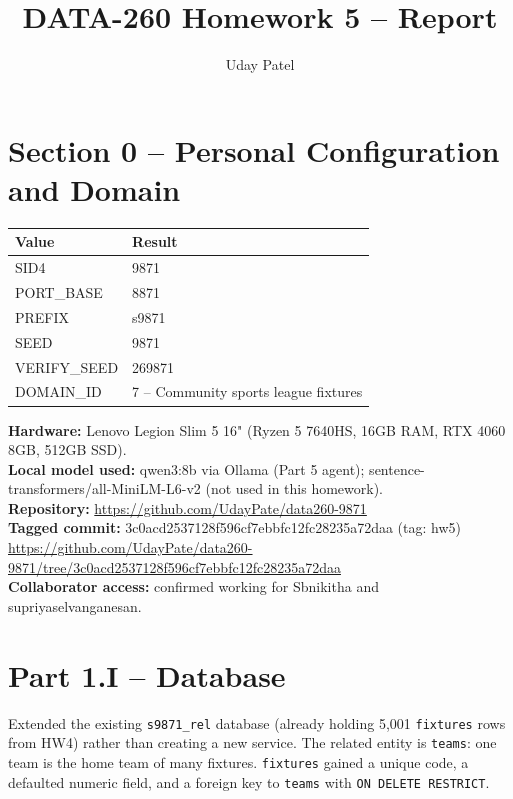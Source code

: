 \documentclass[11pt]{article}
\title{DATA-260 Homework 5 -- Report}
\author{Uday Patel}
\date{}
\begin{document}
\maketitle

\section*{Section 0 -- Personal Configuration and Domain}
\begin{tabular}{|l|l|}\hline
\textbf{Value} & \textbf{Result} \\\hline
SID4 & 9871 \\\hline
PORT\_BASE & 8871 \\\hline
PREFIX & s9871 \\\hline
SEED & 9871 \\\hline
VERIFY\_SEED & 269871 \\\hline
DOMAIN\_ID & 7 -- Community sports league fixtures \\\hline
\end{tabular}
\vspace{1em}

\textbf{Hardware:} Lenovo Legion Slim 5 16" (Ryzen 5 7640HS, 16GB RAM, RTX 4060 8GB, 512GB SSD). \\
\textbf{Local model used:} qwen3:8b via Ollama (Part 5 agent); sentence-transformers/all-MiniLM-L6-v2 (not used in this homework). \\
\textbf{Repository:} \url{https://github.com/UdayPate/data260-9871} \\
\textbf{Tagged commit:} 3c0acd2537128f596cf7ebbfc12fc28235a72daa (tag: hw5) \\
{\footnotesize\url{https://github.com/UdayPate/data260-9871/tree/3c0acd2537128f596cf7ebbfc12fc28235a72daa}} \\
\textbf{Collaborator access:} confirmed working for Sbnikitha and supriyaselvanganesan.

\section*{Part 1.I -- Database}

Extended the existing \verb|s9871_rel| database (already holding 5{,}001
\verb|fixtures| rows from HW4) rather than creating a new service. The
related entity is \verb|teams|: one team is the home team of many
fixtures. \verb|fixtures| gained a unique code, a defaulted numeric field,
and a foreign key to \verb|teams| with \verb|ON DELETE RESTRICT|.
\end{document}
